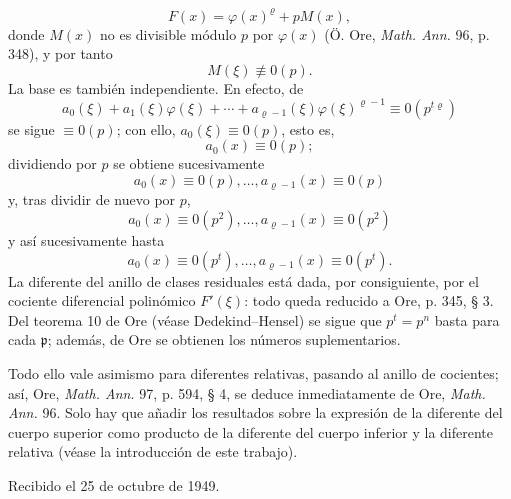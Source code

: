\[
F(x)=\varphi(x)^\varrho+pM(x),
\]
donde $M(x)$ no es divisible módulo $p$ por $\varphi(x)$ (Ö. Ore, \emph{Math. Ann.} 96, p. 348), y por tanto
\[
M(\xi)\not\equiv0(p).
\]
La base es también independiente. En efecto, de
\[
a_0(\xi)+a_1(\xi)\varphi(\xi)+\cdots+a_{\varrho-1}(\xi)\varphi(\xi)^{\varrho-1}
\equiv0(p^{t\varrho})
\]
se sigue $\equiv0(p)$; con ello, $a_0(\xi)\equiv0(p)$, esto es,
\[
a_0(x)\equiv0(p);
\]
dividiendo por $p$ se obtiene sucesivamente
\[
a_0(x)\equiv0(p),\ldots,a_{\varrho-1}(x)\equiv0(p)
\]
y, tras dividir de nuevo por $p$,
\[
a_0(x)\equiv0(p^2),\ldots,a_{\varrho-1}(x)\equiv0(p^2)
\]
y así sucesivamente hasta
\[
a_0(x)\equiv0(p^t),\ldots,a_{\varrho-1}(x)\equiv0(p^t).
\]
La diferente del anillo de clases residuales está dada, por consiguiente, por el cociente diferencial polinómico $F'(\xi)$: todo queda reducido a Ore, p. 345, § 3. Del teorema 10 de Ore (véase Dedekind--Hensel) se sigue que $p^t=p^n$ basta para cada $\mathfrak p$; además, de Ore se obtienen los números suplementarios.

Todo ello vale asimismo para diferentes relativas, pasando al anillo de cocientes; así, Ore, \emph{Math. Ann.} 97, p. 594, § 4, se deduce inmediatamente de Ore, \emph{Math. Ann.} 96. Solo hay que añadir los resultados sobre la expresión de la diferente del cuerpo superior como producto de la diferente del cuerpo inferior y la diferente relativa (véase la introducción de este trabajo).

\begin{center}
Recibido el 25 de octubre de 1949.
\end{center}
